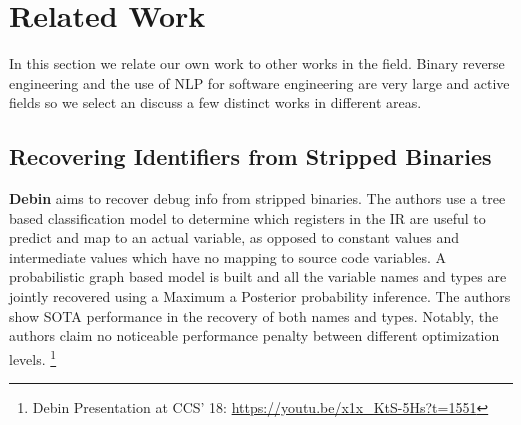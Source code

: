 \chapter{Related Work}
\label{relatedWork}
In this section we relate our own work to other works in the field. Binary reverse engineering and the use of NLP for software engineering are very large and active fields so we select an discuss a few distinct works in different areas.

\section{Recovering Identifiers from Stripped Binaries}
\textbf{Debin} \cite{Debin} aims to recover debug info from stripped binaries. The authors use a tree based classification model to determine which registers in the IR are useful to predict and map to an actual variable, as opposed to constant values and intermediate values which have no mapping to source code variables. A probabilistic graph based model is built and all the variable names and types are jointly recovered using a Maximum a Posterior probability inference. The authors show SOTA performance in the recovery of both names and types. Notably, the authors claim no noticeable performance penalty between different optimization levels. \footnote{Debin Presentation at CCS' 18: \url{https://youtu.be/x1x_KtS-5Hs?t=1551}} 

